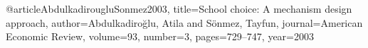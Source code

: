 @article{AbdulkadirougluSonmez2003,
	title={School choice: A mechanism design approach},
	author={Abdulkadiro{\u{g}}lu, Atila and S{\"o}nmez, Tayfun},
	journal={American Economic Review},
	volume={93},
	number={3},
	pages={729--747},
	year={2003}
}